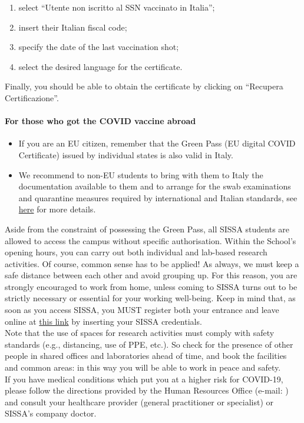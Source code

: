 \documentclass{sissavademecum}
\begin{document}
{\begin{tcolorbox}[breakable, enhanced, sharp corners, colback=green!30, colframe=green!80!blue, title=Obtaining the Green Pass]
\begin{itemize}
    \begin{enumerate}
        \item select ``Utente non iscritto al SSN vaccinato in Italia'';
        \item insert their Italian fiscal code;
        \item specify the date of the last vaccination shot;
        \item select the desired language for the certificate.
    \end{enumerate}
    Finally, you should be able to obtain the certificate by clicking on  ``Recupera Certificazione''.
\end{itemize}
\paragraph{\small For those who got the COVID vaccine abroad}
\begin{itemize}
    \item If you are an EU citizen, remember that the Green Pass (EU digital COVID Certificate) issued by individual states is also valid in Italy.
    \item We recommend to non-EU students to bring with them to Italy the documentation available to them and to arrange for the swab examinations and quarantine measures required by international and Italian standards, see \href{https://www.salute.gov.it/portale/nuovocoronavirus/dettaglioContenutiNuovoCoronavirus.jsp?lingua=english&id=5412&area=nuovoCoronavirus&menu=vuoto}{here} for more details.
\end{itemize}
\end{tcolorbox}
}

Aside from the constraint of possessing the Green Pass, all SISSA students are allowed to access the campus without specific authorisation. Within the School's opening hours, you can carry out both individual and lab-based research activities. Of course, common sense has to be applied! As always, we must keep a safe distance between each other and avoid grouping up. For this reason, you are strongly encouraged to work from home, unless coming to SISSA turns out to be strictly necessary or essential for your working well-being. Keep in mind that, as soon as you access SISSA, you MUST register both your entrance and leave online at \href{https://services.sissa.it/PresenzeWeb/}{this link} by inserting your SISSA credentials. \\
Note that the use of spaces for research activities must comply with safety standards (e.g., distancing, use of PPE, etc.). So check for the presence of other people in shared offices and laboratories ahead of time, and book the facilities and common areas: in this way you will be able to work in peace and safety. \\
If you have medical conditions which put you at a higher risk for COVID-19, please follow the directions provided by the Human Resources Office (e-mail: ) and consult your healthcare provider (general practitioner or specialist) or SISSA's company doctor.
\end{document}

